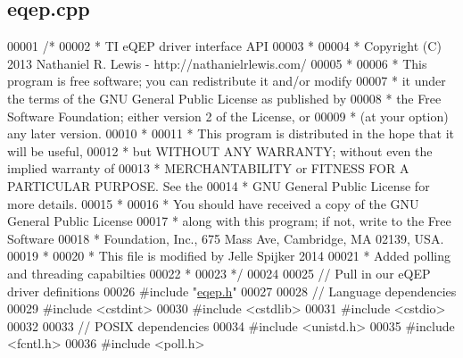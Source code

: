 \hypertarget{eqep_8cpp_source}{}\subsection{eqep.\+cpp}
\label{eqep_8cpp_source}

\begin{DoxyCode}
00001 \textcolor{comment}{/*}
00002 \textcolor{comment}{* TI eQEP driver interface API}
00003 \textcolor{comment}{*}
00004 \textcolor{comment}{* Copyright (C) 2013 Nathaniel R. Lewis - http://nathanielrlewis.com/}
00005 \textcolor{comment}{*}
00006 \textcolor{comment}{* This program is free software; you can redistribute it and/or modify}
00007 \textcolor{comment}{* it under the terms of the GNU General Public License as published by}
00008 \textcolor{comment}{* the Free Software Foundation; either version 2 of the License, or}
00009 \textcolor{comment}{* (at your option) any later version.}
00010 \textcolor{comment}{*}
00011 \textcolor{comment}{* This program is distributed in the hope that it will be useful,}
00012 \textcolor{comment}{* but WITHOUT ANY WARRANTY; without even the implied warranty of}
00013 \textcolor{comment}{* MERCHANTABILITY or FITNESS FOR A PARTICULAR PURPOSE. See the}
00014 \textcolor{comment}{* GNU General Public License for more details.}
00015 \textcolor{comment}{*}
00016 \textcolor{comment}{* You should have received a copy of the GNU General Public License}
00017 \textcolor{comment}{* along with this program; if not, write to the Free Software}
00018 \textcolor{comment}{* Foundation, Inc., 675 Mass Ave, Cambridge, MA 02139, USA.}
00019 \textcolor{comment}{*}
00020 \textcolor{comment}{* This file is modified by Jelle Spijker 2014}
00021 \textcolor{comment}{* Added polling and threading capabilties}
00022 \textcolor{comment}{*}
00023 \textcolor{comment}{*/}
00024 
00025 \textcolor{comment}{// Pull in our eQEP driver definitions}
00026 \textcolor{preprocessor}{#include "\hyperlink{eqep_8h}{eqep.h}"}
00027 
00028 \textcolor{comment}{// Language dependencies}
00029 \textcolor{preprocessor}{#include <cstdint>}
00030 \textcolor{preprocessor}{#include <cstdlib>}
00031 \textcolor{preprocessor}{#include <cstdio>}
00032 
00033 \textcolor{comment}{// POSIX dependencies}
00034 \textcolor{preprocessor}{#include <unistd.h>}
00035 \textcolor{preprocessor}{#include <fcntl.h>}
00036 \textcolor{preprocessor}{#include <poll.h>}

\end{DoxyCode}
